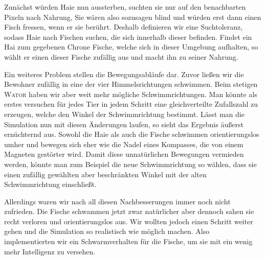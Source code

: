 \documentclass[a4paper,11pt]{article}
\newcommand{\wator}{\textsc{Wator }}
\theoremstyle{definition}
\numberwithin{equation}{section}
\begin{document}
	Zunächst würden Haie nun aussterben, suchten sie nur auf den benachbarten Pixeln nach Nahrung, Sie wären also sozusagen blind und würden erst dann einen Fisch fressen, wenn er sie berührt. Deshalb definieren wir eine Suchtoleranz, sodass Haie nach Fischen suchen, die sich innerhalb dieser befinden. Findet ein Hai zum gegebenen Chrone Fische, welche sich in dieser Umgebung aufhalten, so wählt er einen dieser Fische zufällig aus und macht ihn zu seiner Nahrung.\newline
	
	Ein weiteres Problem stellen die Bewegungsabläufe dar. Zuvor ließen wir die Bewohner zufällig in eine der vier Himmelsrichtungen schwimmen. Beim stetigen \wator haben wir aber weit mehr mögliche Schwimmrichtungen. Man könnte als erstes versuchen für jedes Tier in jedem Schritt eine gleichverteilte Zufallszahl zu erzeugen, welche den Winkel der Schwimmrichtung bestimmt.
	Lässt man die Simulation nun mit diesen Änderungen laufen, so sieht das Ergebnis äußerst ernüchternd aus.
	Sowohl die Haie als auch die Fische schwimmen orientierungslos umher und bewegen sich eher wie die Nadel eines Kompasses, die von einem Magneten gestörter wird. 
	Damit diese unnatürlichen Bewegungen vermieden werden, könnte man zum Beispiel die neue Schwimmrichtung so wählen, dass sie einen zufällig gewählten aber beschränkten Winkel mit der alten Schwimmrichtung einschließt.\newline
	
	Allerdings waren wir nach all diesen Nachbesserungen immer noch nicht zufrieden. Die Fische schwammen jetzt zwar natürlicher aber dennoch sahen sie recht verloren und orientierungslos aus. Wir wollten jedoch einen Schritt weiter gehen und die Simulation so realistisch wie möglich machen. Also implementierten wir ein Schwarmverhalten für die Fische, um sie mit ein wenig mehr Intelligenz zu versehen.
	
\end{document}
